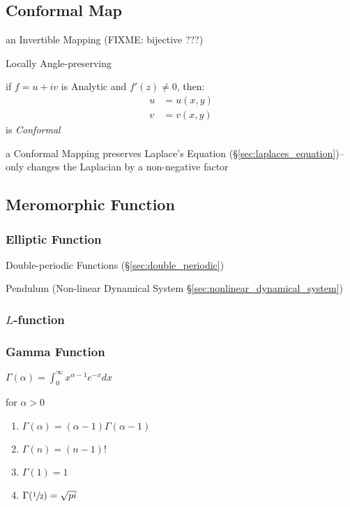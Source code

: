 \subsection{Conformal Map}\label{sec:conformal_map}

an Invertible Mapping (FIXME: bijective ???)

Locally Angle-preserving

if $f = u + iv$ is Analytic and $f'(z) \neq 0$, then:
\begin{align*}
  u & = u(x,y) \\
  v & = v(x,y)
\end{align*}
is \emph{Conformal}

a Conformal Mapping preserves Laplace's Equation
(\S\ref{sec:laplaces_equation})-- only changes the Laplacian by a non-negative
factor



\subsection{Meromorphic Function}\label{sec:meromorphic_function}

\subsubsection{Elliptic Function}\label{sec:elliptic_function}

Double-periodic Functions (\S\ref{sec:double_periodic})

Pendulum (Non-linear Dynamical System \S\ref{sec:nonlinear_dynamical_system})



\subsubsection{$L$-function}\label{sec:l_function}

\subsubsection{Gamma Function}\label{sec:gamma_function}

$\Gamma(\alpha) = \int_0^{\infty} x^{\alpha -1} e^{-x} dx$

for $\alpha > 0$

\begin{enumerate}
\item $\Gamma(\alpha) = (\alpha - 1) \Gamma(\alpha -1)$
\item $\Gamma(n) = (n-1)!$
\item $\Gamma(1) = 1$
\item $\Gamma(\sfrac{1}{2}) = \sqrt{pi}$
\end{enumerate}

